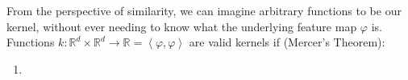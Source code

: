 From the perspective of similarity, we can imagine arbitrary functions to be our kernel, without ever needing to know what the underlying feature map $\varphi$ is.\pause{}\\ Functions $k:\mathbb{R}^d\times \mathbb{R}^d \rightarrow  \mathbb{R}=\left\langle \varphi , \varphi \right\rangle$ are valid kernels if (Mercer's Theorem):

\begin{enumerate}
	\item {}
\end{enumerate}
